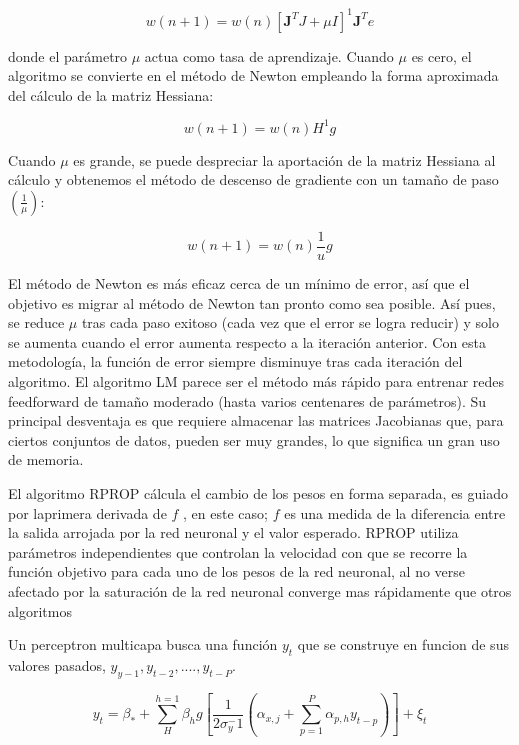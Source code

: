 \documentclass[12pt]{article}
\newcounter{subsubsubsection}[subsubsection]
\newcounter{subsubsubsubsection}[subsubsubsection]
\begin{document}
\begin{equation}
w(n+1) = w(n)[\textbf{J}^TJ + \mu I]^1\textbf{J}^Te
\end{equation}

donde el parámetro $\mu$ actua como tasa de aprendizaje. Cuando $\mu$ es cero, el algoritmo
se convierte en el método de Newton empleando la forma aproximada del cálculo de la matriz Hessiana:

\begin{equation}
w(n+1) = w(n)H^1g
\end{equation}

Cuando $\mu$ es grande, se puede despreciar la aportación de la matriz Hessiana al cálculo y obtenemos el método de descenso de gradiente con un tamaño de paso $(\frac{1}{\mu}):$

\begin{equation}
w(n+1) = w(n)\frac{1}{u}g
\end{equation}

El método de Newton es más eficaz cerca de un mínimo de error, así que el objetivo es migrar al método de Newton tan pronto como sea posible. Así pues, se reduce $\mu$ tras cada paso exitoso (cada vez que el error se logra reducir) y solo se aumenta cuando el
error aumenta respecto a la iteración anterior. Con esta metodología, la función de error siempre disminuye tras cada iteración del algoritmo.
El algoritmo LM parece ser el método más rápido para entrenar redes feedforward de tamaño moderado (hasta varios centenares de parámetros). Su principal desventaja es que requiere almacenar las matrices Jacobianas que, para ciertos conjuntos de datos,
pueden ser muy grandes, lo que significa un gran uso de memoria.

El algoritmo RPROP cálcula el cambio de los pesos en forma separada, es guiado por laprimera derivada de $f$ , en este caso; $f$ es una medida de la diferencia entre la salida arrojada por la red neuronal y el valor esperado. RPROP utiliza parámetros independientes que controlan la velocidad con que se recorre la función objetivo para cada uno de los pesos de la red neuronal, al no verse afectado por la saturación de la red neuronal converge mas rápidamente que otros algoritmos

Un perceptron multicapa busca  una función $y_t$ que se construye  en funcion  de sus valores  pasados, $y_{y-1}, y_{t-2}, ...., y_{t-P}$.

\begin{equation}
y_t = \beta_* + \sum_{H}^{h=1}\beta_hg [\frac{1}{2\sigma_y^-1}(\alpha_{x,j} + \sum_{p=1}^{P}\alpha_{p,h}y_{t-p})] + \xi_t
\end{equation}
\end{document}
